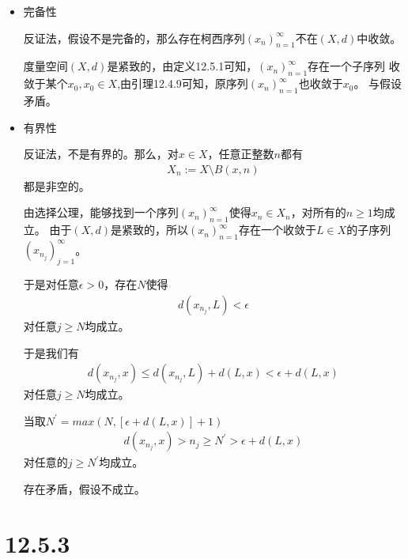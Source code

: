 \documentclass{article}
\begin{document}
\begin{itemize}
  \item 完备性

        反证法，假设不是完备的，那么存在柯西序列$(x_n)_{n = 1}^\infty$不在$(X,d)$中收敛。

        度量空间$(X,d)$是紧致的，由定义12.5.1可知，$(x_n)_{n = 1}^\infty$存在一个子序列
        收敛于某个$x_0, x_0 \in X$,由引理12.4.9可知，原序列$(x_n)_{n = 1}^\infty$也收敛于$x_0$。
        与假设矛盾。

  \item 有界性

        反证法，不是有界的。那么，对$x \in X$，任意正整数$n$都有
        \begin{align*}
          X_n := X \setminus B(x, n)
        \end{align*}
        都是非空的。

        由选择公理，能够找到一个序列$(x_n)_{n = 1}^\infty$使得$x_n \in X_n$，对所有的$n \geq 1$均成立。
        由于$(X,d)$是紧致的，所以$(x_n)_{n = 1}^\infty$存在一个收敛于$L \in X$的子序列$(x_{n_j})_{j = 1}^\infty$。

        于是对任意$\epsilon > 0$，存在$N$使得
        \begin{align*}
          d(x_{n_j}, L) < \epsilon
        \end{align*}
        对任意$j \geq N$均成立。

        于是我们有
        \begin{align*}
          d(x_{n_j}, x) \leq d(x_{n_j}, L) + d(L, x) < \epsilon + d(L, x)
        \end{align*}
        对任意$j \geq N$均成立。

        当取$N^\prime = max(N, [\epsilon + d(L, x)] + 1) $
        \begin{align*}
          d(x_{n_j}, x) > n_j \geq N^\prime > \epsilon + d(L, x)
        \end{align*}
        对任意的$j \geq N^\prime$均成立。

        存在矛盾，假设不成立。

\end{itemize}

\section*{12.5.3}
\end{document}
